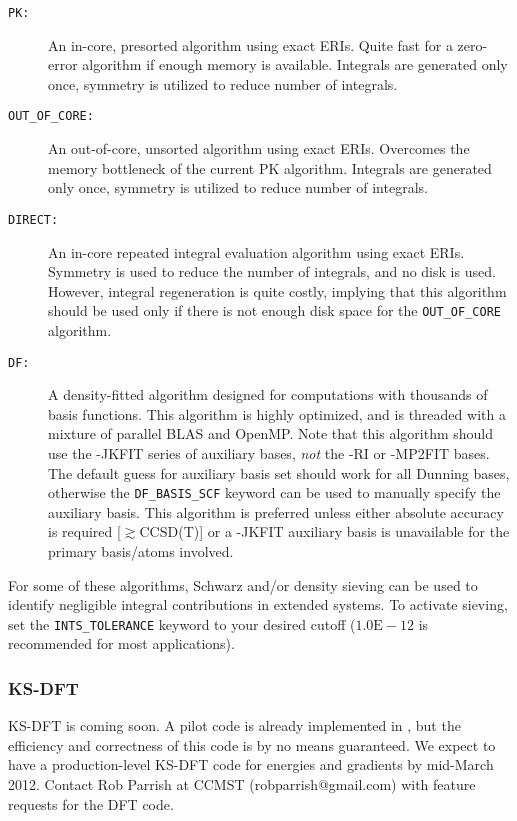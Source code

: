 \begin{description}
\item[\texttt{PK:}] An in-core, presorted algorithm using exact ERIs. Quite fast
for a zero-error algorithm if enough memory is available. Integrals are
generated only once, symmetry is utilized to reduce number of integrals. 
\item[\texttt{OUT\_OF\_CORE:}] An out-of-core, unsorted algorithm using exact
ERIs. Overcomes the memory bottleneck of the current PK algorithm. Integrals are
generated only once, symmetry is utilized to reduce number of integrals. 
\item[\texttt{DIRECT:}] An in-core repeated integral evaluation algorithm using
exact ERIs. Symmetry is used to reduce the number of integrals, and no disk is
used. However, integral regeneration is quite costly, implying that this
algorithm should be used only if there is not enough disk space for the
\texttt{OUT\_OF\_CORE} algorithm. 
\item[\texttt{DF:}] A density-fitted algorithm designed for computations with
thousands of basis functions. This algorithm is highly optimized, and is
threaded with a mixture of parallel BLAS and OpenMP. Note that this algorithm
should use the -JKFIT series of auxiliary bases, \emph{not} the -RI or -MP2FIT
bases. The default guess for auxiliary basis set should work for all Dunning
bases, otherwise the \texttt{DF\_BASIS\_SCF} keyword can be used to manually
specify the auxiliary basis. This algorithm is preferred unless either
absolute accuracy is required [$\gtrsim$CCSD(T)] or a -JKFIT auxiliary basis is
unavailable for the primary basis/atoms involved. 
\end{description}

For some of these algorithms, Schwarz and/or density sieving can be used to
identify negligible integral contributions in extended systems. To activate
sieving, set the \texttt{INTS\_TOLERANCE} keyword to your desired cutoff
($1.0\mathrm{E}-12$ is recommended for most applications).

\subsubsection{KS-DFT} 

KS-DFT is coming soon. A pilot code is already implemented in \PSIfour, but the
efficiency and correctness of this code is by no means guaranteed. We expect to
have a production-level KS-DFT code for energies and gradients by mid-March
2012. Contact Rob Parrish at CCMST (robparrish@gmail.com) with feature requests
for the DFT code. 

